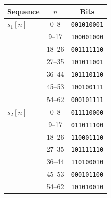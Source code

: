 \begin{tabular}{lcc}
\toprule
Sequence & $n$ & Bits \\
\midrule
$s_1[n]$ & 0--8 & \texttt{001010001} \\
 & 9--17 & \texttt{100001000} \\
 & 18--26 & \texttt{001111110} \\
 & 27--35 & \texttt{101011001} \\
 & 36--44 & \texttt{101110110} \\
 & 45--53 & \texttt{100100111} \\
 & 54--62 & \texttt{000101111} \\
\midrule
$s_2[n]$ & 0--8 & \texttt{011110000} \\
 & 9--17 & \texttt{011011100} \\
 & 18--26 & \texttt{110001110} \\
 & 27--35 & \texttt{101111110} \\
 & 36--44 & \texttt{110100010} \\
 & 45--53 & \texttt{000101100} \\
 & 54--62 & \texttt{101010010} \\
\bottomrule
\end{tabular}
